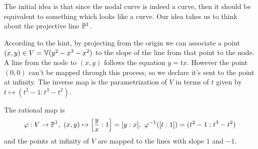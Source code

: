 \documentclass[12pt]{memoir}
\begin{document}
\begin{ptcbr}
    The initial idea is that since the nodal curve is indeed a curve, then it should be equivalent to something which looks like a curve. Our idea takes us to think about the projective line $\mathbb{P}^1$.\par 
    According to the hint, by projecting from the origin we can associate a point $(x,y)\in V=\mathbb{V}(y^2-x^3-x^2)$ to the slope of the line from that point to the node. A line from the node to $(x,y)$ follows the equation $y=tx$. However the point $(0,0)$ can't be mapped through this process, so we declare it's sent to the point at infinity. The inverse map is the parametrization of $V$ in terms of $t$ given by $t\mapsto(t^2-1:t^3-t^2)$.\par 
    The rational map is 
    $$\vf:V\to\bP^1,\ (x,y)\mapsto\bonj{\frac{y}{x}:1}=[y:x],\ \vf^{-1}([t:1])=(t^2-1:t^3-t^2)$$
    and the points at infinity of $V$ are mapped to the lines with slope $1$ and $-1$. 
\end{ptcbr}
\end{document}
